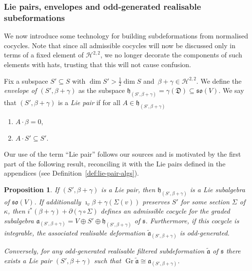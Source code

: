 \documentclass[10pt,a4paper]{amsart}
\numberwithin{equation}{section}
\newtheorem{Proposition}[Theorem]{Proposition}
 { \theoremstyle{definition}
\newtheorem{Definition}[Theorem]{Definition}
\newtheorem{Note}[Theorem]{Note}
\newtheorem{Example}[Theorem]{Example}
\newtheorem{Remark}[Theorem]{Remark} }
\newcommand{\fa}{\mathfrak{a}}
\newcommand{\fh}{\mathfrak{h}}
\newcommand{\fs}{\mathfrak{s}}
\newcommand{\fso}{\mathfrak{so}}
\newcommand{\fD}{\mathfrak{D}}
\newcommand{\cH}{\mathcal{H}}
\newcommand{\fatilde}{\widetilde{\fa}}
\newcommand{\1}{\mathbbm{1}}
\DeclareMathOperator{\Gr}{Gr}
\begin{document}
\subsubsection{Lie pairs, envelopes and odd-generated realisable subeformations}

We now introduce some technology for building subdeformations from normalised cocycles. Note that since all admissible cocycles will now be discussed only in terms of a fixed element of $\cH^{2,2}$, we no longer decorate the components of such elements with hats, trusting that this will not cause confusion.

\begin{Definition}\label{def:envelope}
	Fix a subspace $S'\subseteq S$ with $\dim S'>\frac{1}{2}\dim S$ and~${\beta+\gamma\in\cH^{2,2}}$. We define the \emph{envelope of $(S',\beta+\gamma)$} as the subspace
$\fh_{(S',\beta+\gamma)}=\gamma(\fD) \subseteq \fso(V)$.
	We say that $(S',\beta+\gamma)$ is a \emph{Lie pair} if for all $A\in\fh_{(S',\beta+\gamma)}$
	\begin{enumerate}\itemsep=0pt
	\item $A\cdot\beta=0$,
	\item $A\cdot S' \subseteq S'$.
	\end{enumerate}
\end{Definition}

Our use of the term ``Lie pair'' follows our sources \cite{Figueroa-OFarrill2017_1,Santi2022} and is motivated by the first part of the following result, reconciling it with the Lie pairs defined in the appendices (see Definition~\ref{def:lie-pair-algs}).

\begin{Proposition}\label{prop:lie-pair-admiss-cocycle}
	If $(S',\beta+\gamma)$ is a Lie pair, then $\fh_{(S',\beta+\gamma)}$ is a Lie subalgebra of $\fso(V)$. If additionally $\imath_v\beta+\gamma(\Sigma(v))$ preserves $S'$ for some section $\Sigma$ of $\kappa$, then $i^*(\beta+\gamma)+\partial(\gamma\circ\Sigma)$ defines an admissible cocycle for the graded subalgebra $\fa_{(S',\beta+\gamma)}=V\oplus S'\oplus\fh_{(S',\beta+\gamma)}$ of $\fs$. Furthermore, if this cocycle is integrable, the associated realisable deformation $\fatilde_{(S',\beta+\gamma)}$ is odd-generated.
	
	Conversely, for any odd-generated realisable filtered subdeformation $\fatilde$ of $\fs$ there exists a Lie pair $(S',\beta+\gamma)$ such that $\Gr\fatilde\cong\fa_{(S',\beta+\gamma)}$.
\end{Proposition}
\end{document}
